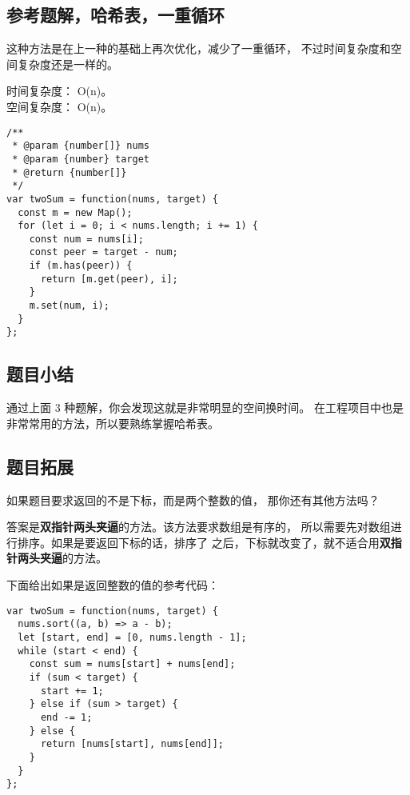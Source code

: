 \subsection{参考题解，哈希表，一重循环}

这种方法是在上一种的基础上再次优化，减少了一重循环，
不过时间复杂度和空间复杂度还是一样的。

时间复杂度： O(n)。\\
空间复杂度： O(n)。

\begin{verbatim}
/**
 * @param {number[]} nums
 * @param {number} target
 * @return {number[]}
 */
var twoSum = function(nums, target) {
  const m = new Map();
  for (let i = 0; i < nums.length; i += 1) {
    const num = nums[i];
    const peer = target - num;
    if (m.has(peer)) {
      return [m.get(peer), i];
    }
    m.set(num, i);
  }
};
\end{verbatim}

\subsection{题目小结}

通过上面 3 种题解，你会发现这就是非常明显的空间换时间。
在工程项目中也是非常常用的方法，所以要熟练掌握哈希表。

\subsection{题目拓展}

如果题目要求返回的不是下标，而是两个整数的值，
那你还有其他方法吗？

答案是\textbf{双指针两头夹逼}的方法。该方法要求数组是有序的，
所以需要先对数组进行排序。如果是要返回下标的话，排序了
之后，下标就改变了，就不适合用\textbf{双指针两头夹逼}的方法。

下面给出如果是返回整数的值的参考代码：

\begin{verbatim}
var twoSum = function(nums, target) {
  nums.sort((a, b) => a - b);
  let [start, end] = [0, nums.length - 1];
  while (start < end) {
    const sum = nums[start] + nums[end];
    if (sum < target) {
      start += 1;
    } else if (sum > target) {
      end -= 1;
    } else {
      return [nums[start], nums[end]];
    }
  }
};
\end{verbatim}

